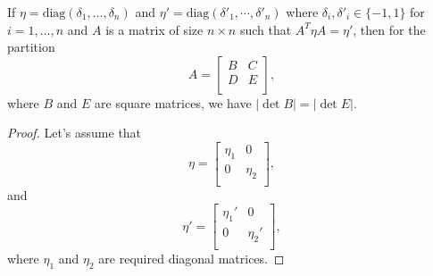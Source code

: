 \documentclass[main.tex]{subfiles}
\begin{document}
\begin{theorem}
\label{skwed-lorentz-computations}
If $\eta = \text{diag}(\delta_1, \dots, \delta_n)$ and 
$\eta' = \text{diag}(\delta'_1, \cdots, \delta'_n)$ where 
$\delta_i, \delta'_i\in \{-1, 1\}$ for $i=1, \dots, n$ and $A$ is a matrix of size $n\times n$ such that 
$A^T\eta A = \eta'$, then for the partition
\begin{equation}
A = \begin{bmatrix}
    B &  C \\
    D & E \\
\end{bmatrix},
\end{equation}
where $B$ and $E$ are square matrices, we have $|\det B| = |\det E|$.
\end{theorem}
\begin{proof}
Let's assume that 
\begin{equation}
\eta = \begin{bmatrix}
    \eta_1 &  0 \\
    0 & \eta_2 \\
\end{bmatrix},
\end{equation}
and
\begin{equation}
\eta' = \begin{bmatrix}
    \eta_1' &  0 \\
    0 & \eta_2' \\
\end{bmatrix},
\end{equation}
where $\eta_1$ and $\eta_2$ are required diagonal matrices.


\end{proof}
\end{document}
